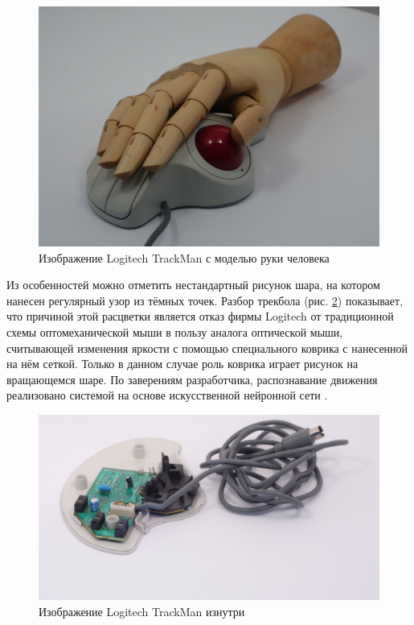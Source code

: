 \documentclass[11pt, a4paper]{article}
\begin{document}
\begin{figure}[h]
    \centering
    \includegraphics[scale=0.5]{1995_logitech_trackman/2.14.JPG}
    \caption{Изображение Logitech TrackMan с моделью руки человека}
    \label{fig:trackmanHand}
\end{figure}

Из особенностей можно отметить нестандартный рисунок шара, на котором нанесен регулярный узор из тёмных точек. Разбор трекбола (рис. \ref{fig:trackmanInside}) показывает, что причиной этой расцветки является отказ фирмы Logitech от традиционной схемы оптомеханической мыши в пользу аналога оптической мыши, считывающей изменения яркости с помощью специального коврика с нанесенной на нём сеткой. Только в данном случае роль коврика играет рисунок на вращающемся шаре. По заверениям разработчика, распознавание движения реализовано системой на основе искусственной нейронной сети \cite{marbleAdv}.

\begin{figure}[h]
    \centering
    \includegraphics[scale=0.5]{1995_logitech_trackman/201.JPG}
    \caption{Изображение Logitech TrackMan изнутри}
    \label{fig:trackmanInside}
\end{figure}
\end{document}
